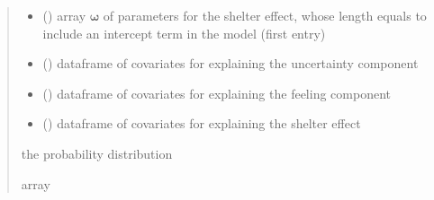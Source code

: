 \documentclass[letterpaper,10pt,english]{sphinxmanual}
\begin{document}
\begin{fulllineitems}
\begin{quote}
\begin{description}
\begin{itemize}
\item {} 
\sphinxAtStartPar
{} () \textendash{} array \(\pmb \omega\) of parameters for the shelter effect, whose length equals 
 to include an intercept term in the model (first entry)

\item {} 
\sphinxAtStartPar
{} () \textendash{} dataframe of covariates for explaining the uncertainty component

\item {} 
\sphinxAtStartPar
{} () \textendash{} dataframe of covariates for explaining the feeling component

\item {} 
\sphinxAtStartPar
{} () \textendash{} dataframe of covariates for explaining the shelter effect

\end{itemize}

\sphinxAtStartPar
the probability distribution

\sphinxAtStartPar
array

\end{description}\end{quote}

\end{fulllineitems}

\end{document}
